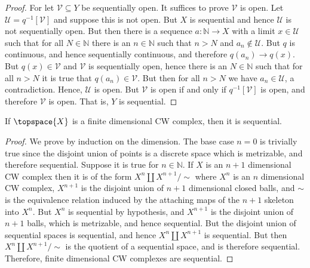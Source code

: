 \documentclass{book}                                                           %
\begin{document}
                    \begin{proof}
                        For let $\mathcal{V}\subseteq{Y}$ be sequentially open.
                        It suffices to prove $\mathcal{V}$ is open. Let
                        $\mathcal{U}=q^{\minus{1}}[\mathcal{V}]$ and suppose
                        this is not open. But $X$ is sequential and hence
                        $\mathcal{U}$ is not sequentially open. But then there
                        is a sequence $a:\mathbb{N}\rightarrow{X}$ with a limit
                        $x\in\mathcal{U}$ such that for all $N\in\mathbb{N}$
                        there is an $n\in\mathbb{N}$ such that $n>N$ and
                        $a_{n}\notin\mathcal{U}$. But $q$ is continuous, and
                        hence sequentially continuous, and therefore
                        $q(a_{n})\rightarrow{q}(x)$. But $q(x)\in\mathcal{V}$
                        and $\mathcal{V}$ is sequentially open, hence there is
                        an $N\in\mathbb{N}$ such that for all $n>N$ it is true
                        that $q(a_{n})\in\mathcal{V}$. But then for all $n>N$ we
                        have $a_{n}\in\mathcal{U}$, a contradiction. Hence,
                        $\mathcal{U}$ is open. But $\mathcal{V}$ is open if and
                        only if $q^{\minus{1}}[\mathcal{V}]$ is open, and
                        therefore $\mathcal{V}$ is open. That is, $Y$ is
                        sequential.
                    \end{proof}
                    \begin{theorem}
                        If $\topspace{X}$ is a finite dimensional CW complex,
                        then it is sequential.
                    \end{theorem}
                    \begin{proof}
                        We prove by induction on the dimension. The base case
                        $n=0$ is trivially true since the disjoint union of
                        points is a discrete space which is metrizable, and
                        therefore sequential. Suppose it is true for
                        $n\in\mathbb{N}$. If $X$ is an $n+1$ dimensional CW
                        complex then it is of the form $X^{n}\coprod{X}^{n+1}/\sim$
                        where $X^{n}$ is an $n$ dimensional CW complex, $X^{n+1}$
                        is the disjoint union of $n+1$ dimensional closed balls,
                        and $\sim$ is the equivalence relation induced by the
                        attaching maps of the $n+1$ skeleton into $X^{n}$. But
                        $X^{n}$ is sequential by hypothesis, and $X^{n+1}$ is
                        the disjoint union of $n+1$ balls, which is metrizable,
                        and hence sequential. But the disjoint union of
                        sequential spaces is sequential, and hence
                        $X^{n}\coprod{X}^{n+1}$ is sequential. But then
                        $X^{n}\coprod{X}^{n+1}/\sim$ is the quotient of a
                        sequential space, and is therefore sequential. Therefore,
                        finite dimensional CW complexes are sequential.
                    \end{proof}
\end{document}
